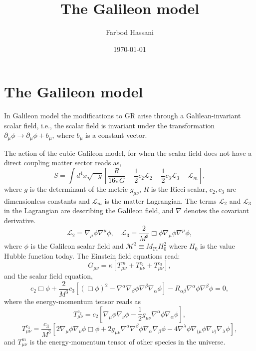 \documentclass{article}
\title{The Galileon model}
\author{Farbod Hassani}
\date{\today}
\def\be{\begin{equation}}
\def\ee{\end{equation}}
\begin{document}
\maketitle 

\section{The Galileon model}
In Galileon model  the modifications to GR arise through a
Galilean-invariant scalar field, i.e., the scalar field is invariant under the
transformation $\partial_{\mu} \phi \to \partial_{\mu} \phi + b_{\mu}$, where $b_{\mu}$ is a constant vector.

The action of the cubic Galileon model, for when the scalar field does not have a direct coupling matter sector reads as,
\be
S = \int d^4x \sqrt{-g} \left[ \frac{R}{16\pi G} - \frac{1}{2}c_2\mathcal{L}_2 - \frac{1}{2}c_3\mathcal{L}_3 - \mathcal{L}_m \right],
\ee
where $g$ is the determinant of the metric $g_{\mu \nu}$, $R$ is the Ricci scalar, $c_2, c_3$ are dimensionless constants and $\mathcal{L}_m$ is the matter Lagrangian. The terms $\mathcal{L}_2$ and $\mathcal{L}_3$ in the Lagrangian are describing the Galileon field, and $\nabla$ denotes the covariant derivative.
\be
\mathcal{L}_2 = \nabla_\mu \phi \nabla^\mu \phi, \quad \mathcal{L}_3 = \frac{2}{M^3} \Box \phi \nabla_\mu \phi \nabla^\mu \phi,
\ee
where $\phi$ is the Galileon scalar field and $\mathcal{M}^3 \equiv M_{\mathrm{Pl}} H_0^2$ where $H_0$ is the value Hubble function today.
The Einstein field equations read:
\begin{equation}
G_{\mu\nu} = \kappa \left[ T_{\mu\nu}^m + T_{\mu\nu}^{c_2} + T_{\mu\nu}^{c_3} \right],
\end{equation}
 and the scalar field equation,
\begin{equation}
c_2 \Box \phi + \frac{2}{M^3} c_3 \left[ (\Box \phi)^2 - \nabla^\alpha \nabla_\beta \phi \nabla^\beta \nabla_\alpha \phi \right] - R_{\alpha\beta} \nabla^\alpha \phi \nabla^\beta \phi = 0,
\end{equation}
where the energy-momentum tensor reads as %
\begin{equation}
T_{\mu\nu}^{c_2} = c_2 \left[ \nabla_\mu \phi \nabla_\nu \phi - \frac{1}{2} g_{\mu\nu} \nabla^\alpha \phi \nabla_\alpha \phi \right],
\end{equation}
\begin{equation}
T_{\mu\nu}^{c_3} = \frac{c_3}{M^3} \left[ 2 \nabla_\mu \phi \nabla_\nu \phi \Box \phi + 2 g_{\mu\nu} \nabla^\alpha \nabla^\beta \phi \nabla_\alpha \nabla_\beta \phi - 4 \nabla^\lambda \phi \nabla_{(\mu} \phi \nabla_{\nu)} \nabla_\lambda \phi \right],
\end{equation}
and $T^m_{\mu \nu}$ is the energy-momentum tensor of other species in the universe.
\end{document}
